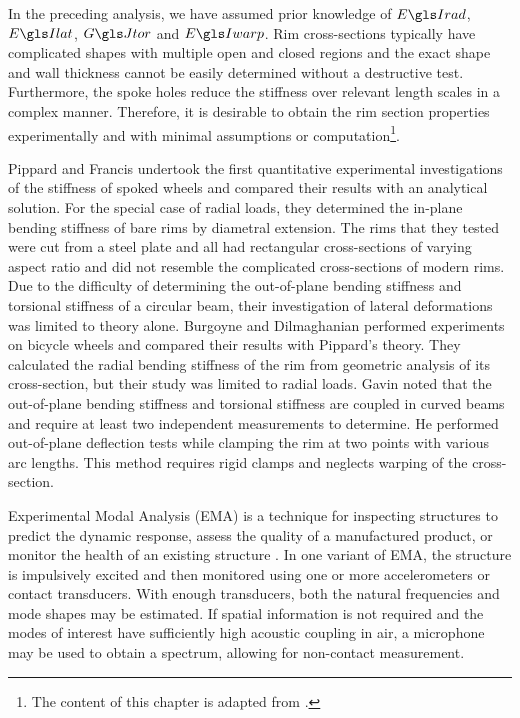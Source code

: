 \documentclass[../thesis.tex]{subfiles}
\begin{document}
In the preceding analysis, we have assumed prior knowledge of $\EIr$, $\EIl$, $\GJ$ and $\EIw$. Rim cross-sections typically have complicated shapes with multiple open and closed regions and the exact shape and wall thickness cannot be easily determined without a destructive test. Furthermore, the spoke holes reduce the stiffness over relevant length scales in a complex manner. Therefore, it is desirable to obtain the rim section properties experimentally and with minimal assumptions or computation\footnote{The content of this chapter is adapted from \cite{Ford2018}.}.

Pippard and Francis \cite{Pippard1931} undertook the first quantitative experimental investigations of the stiffness of spoked wheels and compared their results with an analytical solution. For the special case of radial loads, they determined the in-plane bending stiffness of bare rims by diametral extension. The rims that they tested were cut from a steel plate and all had rectangular cross-sections of varying aspect ratio and did not resemble the complicated cross-sections of modern rims. Due to the difficulty of determining the out-of-plane bending stiffness and torsional stiffness of a circular beam, their investigation of lateral deformations was limited to theory alone. Burgoyne and Dilmaghanian \cite{Burgoyne1993} performed experiments on bicycle wheels and compared their results with Pippard's theory. They calculated the radial bending stiffness of the rim from geometric analysis of its cross-section, but their study was limited to radial loads. Gavin \cite{Gavin1996} noted that the out-of-plane bending stiffness and torsional stiffness are coupled in curved beams and require at least two independent measurements to determine. He performed out-of-plane deflection tests while clamping the rim at two points with various arc lengths. This method requires rigid clamps and neglects warping of the cross-section.

Experimental Modal Analysis (EMA) \cite{Ewins1984} is a technique for inspecting structures to predict the dynamic response, assess the quality of a manufactured product, or monitor the health of an existing structure \cite{Salawu1997}. In one variant of EMA, the structure is impulsively excited and then monitored using one or more accelerometers or contact transducers. With enough transducers, both the natural frequencies and mode shapes may be estimated. If spatial information is not required and the modes of interest have sufficiently high acoustic coupling in air, a microphone may be used to obtain a spectrum, allowing for non-contact measurement.
\end{document}
